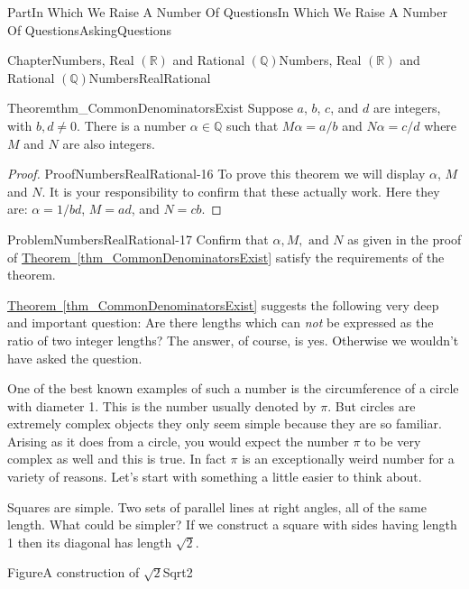 \documentclass[oneside,10pt,]{book}
\newcommand{\xreffont}{\relax}
\numberwithin{equation}{part}
\newcommand{\RR}{\mathbb {R}}
\newcommand{\QQ}{\mathbb {Q}}
\begin{document}
\begin{partptx}{Part}{In Which We Raise A Number Of Questions}{}{In Which We Raise A Number Of Questions}{}{}{AskingQuestions}
\begin{chapterptx}{Chapter}{Numbers, Real \(\left(\RR\right)\) and Rational \(\left(\QQ\right)\)}{}{Numbers, Real \(\left(\RR\right)\) and Rational \(\left(\QQ\right)\)}{}{}{NumbersRealRational}
\begin{theorem}{Theorem}{}{}{thm_CommonDenominatorsExist}%
%
Suppose \(a\), \(b\), \(c\), and \(d\) are integers, with \(b, d \neq 0\). There is a number \(\alpha\in\QQ\) such that \(M\alpha=a/b\) and \(N\alpha=c/d\) where \(M\) and \(N\) are also integers.%
\end{theorem}
\begin{proof}{Proof}{}{NumbersRealRational-16}
To prove this theorem we will display \(\alpha\), \(M\) and \(N\).  It is your responsibility to confirm that these actually work.  Here they are: \(\alpha=1/bd\), \(M=ad\), and \(N=cb\).%
\end{proof}
\begin{problem}{Problem}{}{NumbersRealRational-17}%
Confirm that \(\alpha, M, \text{ and } N\) as given in the proof of \hyperref[thm_CommonDenominatorsExist]{Theorem~{\xreffont\ref{thm_CommonDenominatorsExist}}} satisfy the requirements of the theorem.%
\end{problem}
\hyperref[thm_CommonDenominatorsExist]{Theorem~{\xreffont\ref{thm_CommonDenominatorsExist}}} suggests the following very deep and important question: Are there lengths which can \emph{not} be expressed as the ratio of two integer lengths? The answer, of course, is yes. Otherwise we wouldn't have asked the question.  %
\par
One of the best known examples of such a number is the circumference of a circle with diameter 1. This is the number usually denoted by \(\pi\). But circles are extremely complex objects \textemdash{} they only seem simple because they are so familiar. Arising as it does from a circle, you would expect the number \(\pi\) to be very complex as well and this is true. In fact \(\pi\) is an exceptionally weird number for a variety of reasons. Let's start with something a little easier to think about.%
\par
{} Squares are simple. Two sets of parallel lines at right angles, all of the same length. What could be simpler? If we construct a square with sides having length 1 then its diagonal has length \(\sqrt{2}\).%
\begin{figureptx}{Figure}{A construction of \(\sqrt{2}\)}{Sqrt2}{}%
\begin{image}{0.325}{0.35}{0.325}{}%

\end{image}
\end{figureptx}
\end{chapterptx}
\end{partptx}
\end{document}
